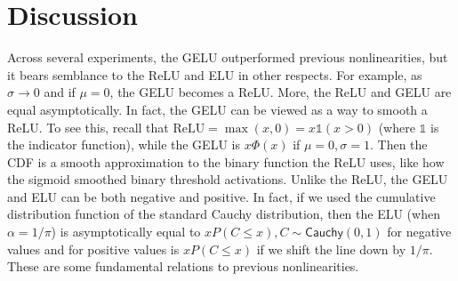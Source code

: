 \documentclass{article}
\begin{document}



\section{Discussion}
Across several experiments, the GELU outperformed previous nonlinearities, but it %
bears semblance to the ReLU and ELU in other respects. For example, as $\sigma \to 0$ and if $\mu = 0$, the GELU becomes a ReLU. More, the ReLU and GELU are equal asymptotically. In fact, the GELU can be viewed as a way to smooth a ReLU. To see this, recall that $\text{ReLU}=\max(x,0)=x\mathds{1}(x>0)$ (where $\mathds{1}$ is the indicator function), while the GELU is $x\Phi(x)$ if $\mu=0,\sigma=1$. Then the CDF is a smooth approximation to the binary function the ReLU uses, like how the sigmoid smoothed binary threshold activations. Unlike the ReLU, the GELU and ELU can be both negative and positive. In fact, if we used the cumulative distribution function of the standard Cauchy distribution, then the ELU (when $\alpha=1/\pi$) is asymptotically equal to $xP(C\le x), C \sim \textsf{Cauchy}(0,1)$ for negative values and for positive values is $xP(C\le x)$ if we shift the line down by $1/\pi$. These are some fundamental relations to previous nonlinearities.
\end{document}
